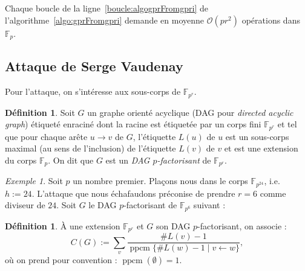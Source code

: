 \documentclass[a4paper, titlepage, 11pt]{article}
\theoremstyle{definition}
\newtheorem{defi}[theo]{Définition}
\theoremstyle{remark}
\newtheorem{exem}[theo]{Exemple}
\def\O{\mathcal O}
\def\gf #1{\mathbb{F}_{#1}}
\def\ppcm{\operatorname{ppcm}}
\begin{document}
Chaque boucle de la ligne~\ref{boucle:algogprFromgpri} de l'algorithme~\ref{algo:gprFromgpri} demande en moyenne $\O(pr^2)$ opérations dans $\gf{p}$.

\subsection{Attaque de Serge Vaudenay}

Pour l'attaque, on s'intéresse aux sous-corps de $\gf{p^r}$.

\begin{defi}
Soit $G$ un graphe orienté acyclique (DAG pour \textit{directed acyclic graph}) étiqueté enraciné dont la racine est étiquetée par un corps fini $\gf{p^r}$ et tel que pour chaque arête $u \rightarrow v$ de $G$, l'étiquette $L(u)$ de $u$ est un sous-corps maximal (au sens de l'inclusion) de l'étiquette $L(v)$ de $v$ et est une extension du corps $\gf{p}$. On dit que $G$ est un \textit{DAG $p$-factorisant} de $\gf{p^r}$.
\end{defi}

\begin{exem}
Soit $p$ un nombre premier. Plaçons nous dans le corps $\gf{p^{24}}$, i.e. $h := 24$. L'attaque que nous échafaudons préconise de prendre $r = 6$ comme diviseur de $24$. Soit $G$ le DAG $p$-factorisant de $\gf{p^6}$ suivant :
\begin{figure}[h]
\begin{center}
\end{center}
\end{figure}
\end{exem}

\begin{defi}
\`A une extension $\gf{p^r}$ et $G$ son DAG $p$-factorisant, on associe :
$$C(G) := \sum_{v} \frac{\#L(v) -1}{\ppcm\{\#L(w)-1 \mid v \leftarrow w\}},$$
où on prend pour convention : $\ppcm(\emptyset) = 1$.
\end{defi}
\end{document}
